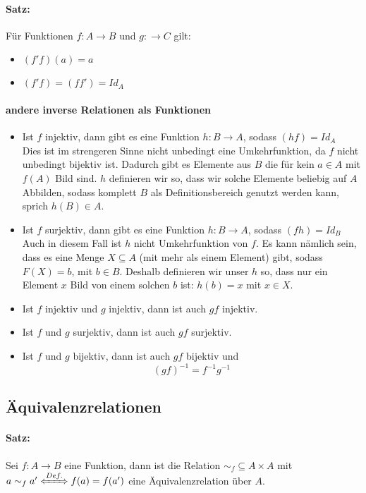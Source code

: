 \paragraph{Satz:}Für Funktionen $f:A\rightarrow B$ und $g:\rightarrow C$ gilt:
\begin{itemize}
\item $(f'f)(a)=a$
\item $(f'f)=(ff')=Id_A$
\end{itemize}
\paragraph{andere inverse Relationen als Funktionen}
\begin{itemize}
\item Ist $f$ injektiv, dann gibt es eine Funktion $h:B\rightarrow A$, sodass $(hf)=Id_A$\\
Dies ist im strengeren Sinne nicht unbedingt eine Umkehrfunktion, da $f$ nicht unbedingt bijektiv ist. Dadurch gibt es Elemente aus $B$ die für kein $a\in A$ mit $f(A)$ Bild sind.
$h$ definieren wir so, dass wir solche Elemente beliebig auf $A$ Abbilden, sodass komplett $B$ als Definitionsbereich genutzt werden kann, sprich $h(B)\in A$.
\item Ist $f$ surjektiv, dann gibt es eine Funktion $h:B\rightarrow A$, sodass $(fh)=Id_B$\\
Auch in diesem Fall ist $h$ nicht Umkehrfunktion von $f$. Es kann nämlich sein, dass es eine Menge $X\subseteq A$ (mit mehr als einem Element) gibt, sodass $F(X)=b$, mit $b\in B$.
Deshalb definieren wir unser $h$ so, dass nur ein Element $x$ Bild von einem solchen $b$ ist: $h(b)=x$ mit $x\in X$.
\item Ist $f$ injektiv und $g$ injektiv, dann ist auch $gf$ injektiv.
\item Ist $f$ und $g$ surjektiv, dann ist auch $gf$ surjektiv.
\item Ist $f$ und $g$ bijektiv, dann ist auch $gf$ bijektiv und
\[
(gf)^{-1}=f^{-1}g^{-1}
\]
\end{itemize}
\subsection{Äquivalenzrelationen}
\paragraph{Satz:}Sei $f:A\rightarrow B$ eine Funktion, dann ist die Relation $\sim_f\subseteq A\times A$ mit $a\sim_f a' \xLeftrightarrow{Def.} f(a)=f(a')$ eine Äquivalenzrelation über $A$.
